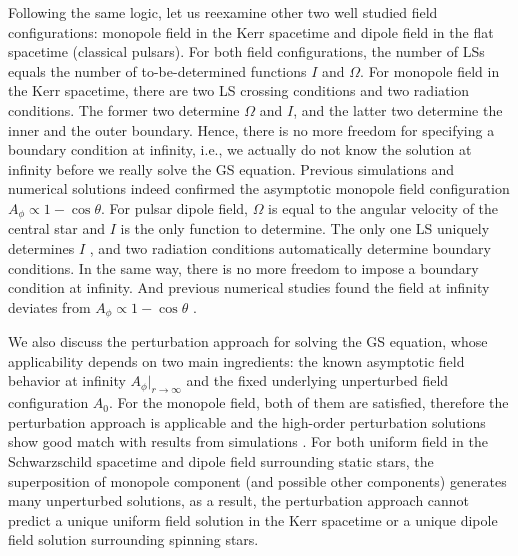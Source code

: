 \documentclass[iop,apj]{emulateapj}
\begin{document}
Following the same logic, let us reexamine other two well studied field configurations:
monopole field in the Kerr spacetime and dipole field in the flat spacetime (classical pulsars).
For both field configurations, the number of LSs equals the number of to-be-determined functions $I$ and $\Omega$.
For monopole field in the Kerr spacetime, there are two LS crossing conditions and two radiation conditions.
The former two determine $\Omega$ and $I$, and the latter two determine the inner and the outer boundary.
Hence, there is no more freedom for specifying a boundary condition at infinity, i.e., we actually
do not know the solution at infinity before we really solve the GS equation.
Previous simulations and numerical solutions indeed confirmed
the asymptotic monopole field configuration $A_\phi \propto 1-\cos\theta$.
For pulsar dipole field, $\Omega$ is equal to the angular velocity of the central star
and $I$ is the only function to determine.
The only one LS uniquely determines $I$ \citep{Contopoulos1999},
and two radiation conditions automatically determine boundary conditions.
In the same way, there is no more freedom to impose a boundary
condition at infinity. And previous numerical studies found the field at infinity deviates from
$A_\phi \propto 1-\cos\theta$ \citep[e.g.][]{Gralla2016b}.

We also discuss the perturbation approach for solving the GS equation, whose
applicability depends on two main ingredients:
the known asymptotic field behavior at infinity $A_\phi|_{r\rightarrow\infty}$
and the fixed underlying unperturbed field configuration $A_0$.
For the monopole field, both of them are satisfied, therefore the perturbation approach
is applicable and the high-order perturbation solutions
show good match with results from simulations \citep{Pan2015b}.
For both uniform field in the Schwarzschild spacetime and dipole field surrounding static stars,
the superposition of monopole component (and possible other components) generates many unperturbed solutions,
as a result, the perturbation approach cannot predict
a unique uniform field solution in the Kerr spacetime or
a unique dipole field solution surrounding spinning stars.
\end{document}
